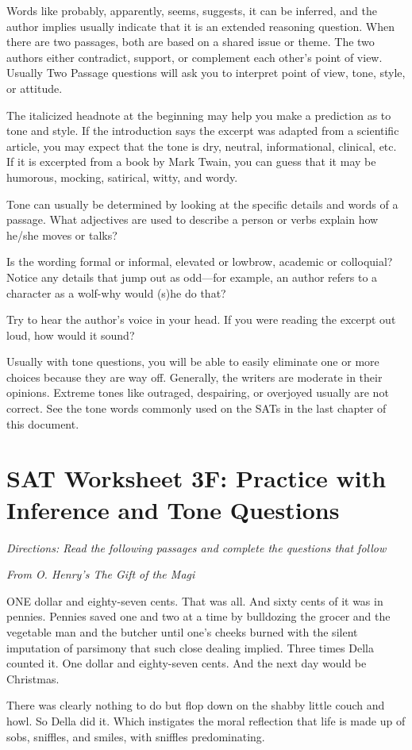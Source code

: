 \documentclass[12pt]{book}
\renewcommand{\indent}{\hspace{1cm}}
\begin{document}
\bigskip
Words like probably, apparently, seems, suggests, it can be inferred, and the author implies usually indicate that it is an extended reasoning question. When there are two passages, both are based on a shared issue or theme.  The two authors either contradict, support, or complement each other's point of view. Usually Two Passage questions will ask you to interpret point of view, tone, style, or attitude.

\bigskip
The italicized headnote at the beginning may help you make a prediction as to tone and style.  If the introduction says the excerpt was adapted from a scientific article, you may expect that the tone is dry, neutral, informational, clinical, etc.  If it is excerpted from a book by Mark Twain, you can guess that it may be humorous, mocking, satirical, witty, and wordy.

\bigskip
Tone can usually be determined by looking at the specific details and words of a passage. What adjectives are used to describe a person or verbs explain how he/she moves or talks?

\bigskip
Is the wording formal or informal, elevated or lowbrow, academic or colloquial?  Notice any details that jump out as odd—for example, an author refers to a character as a wolf-why would (s)he do that?

\bigskip
Try to hear the author's voice in your head.  If you were reading the excerpt out loud, how would it sound? 

\bigskip
Usually with tone questions, you will be able to easily eliminate one or more choices because they are way off.  Generally, the writers are moderate in their opinions.  Extreme tones like outraged, despairing, or overjoyed usually are not correct. See the tone words commonly used on the SATs in the last chapter of this document.

\newpage
\section[Inference and Tone Practice]{SAT Worksheet 3F: Practice with Inference and Tone Questions}
\textit{Directions: Read the following passages and complete the questions that follow}

\bigskip
\textit{From O. Henry's The Gift of the Magi}

\bigskip
\begin{linenumbers*}
\modulolinenumbers[5]
\indent ONE dollar and eighty-seven cents. That was all. And sixty cents of it was in pennies. Pennies saved one and two at a time by bulldozing the grocer and the vegetable man and the butcher until one's cheeks burned with the silent imputation of parsimony that such close dealing implied. Three times Della counted it. One dollar and eighty-seven cents. And the next day would be Christmas.

\indent There was clearly nothing to do but flop down on the shabby little couch and howl. So Della did it. Which instigates the moral reflection that life is made up of sobs, sniffles, and smiles, with sniffles predominating.
\end{linenumbers*}
\end{document}
